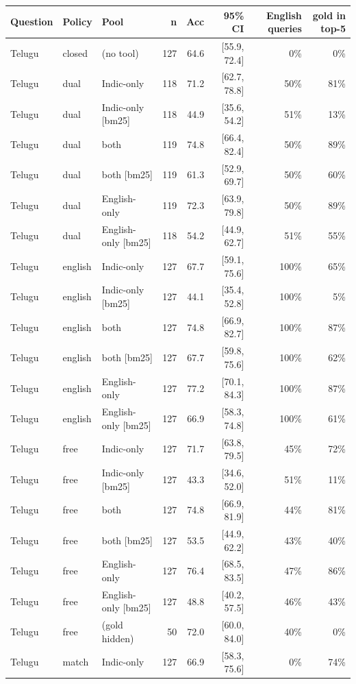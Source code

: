 \begin{table}[htbp]\centering\scriptsize
\begin{tabular}{lllrrrrr}
\toprule
Question & Policy & Pool & n & Acc & 95\% CI & English queries & gold in top-5 \\
\midrule
Telugu & closed & (no tool) & 127 & 64.6 & [55.9, 72.4] & 0\% & 0\% \\
Telugu & dual & Indic-only & 118 & 71.2 & [62.7, 78.8] & 50\% & 81\% \\
Telugu & dual & Indic-only [bm25] & 118 & 44.9 & [35.6, 54.2] & 51\% & 13\% \\
Telugu & dual & both & 119 & 74.8 & [66.4, 82.4] & 50\% & 89\% \\
Telugu & dual & both [bm25] & 119 & 61.3 & [52.9, 69.7] & 50\% & 60\% \\
Telugu & dual & English-only & 119 & 72.3 & [63.9, 79.8] & 50\% & 89\% \\
Telugu & dual & English-only [bm25] & 118 & 54.2 & [44.9, 62.7] & 51\% & 55\% \\
Telugu & english & Indic-only & 127 & 67.7 & [59.1, 75.6] & 100\% & 65\% \\
Telugu & english & Indic-only [bm25] & 127 & 44.1 & [35.4, 52.8] & 100\% & 5\% \\
Telugu & english & both & 127 & 74.8 & [66.9, 82.7] & 100\% & 87\% \\
Telugu & english & both [bm25] & 127 & 67.7 & [59.8, 75.6] & 100\% & 62\% \\
Telugu & english & English-only & 127 & 77.2 & [70.1, 84.3] & 100\% & 87\% \\
Telugu & english & English-only [bm25] & 127 & 66.9 & [58.3, 74.8] & 100\% & 61\% \\
Telugu & free & Indic-only & 127 & 71.7 & [63.8, 79.5] & 45\% & 72\% \\
Telugu & free & Indic-only [bm25] & 127 & 43.3 & [34.6, 52.0] & 51\% & 11\% \\
Telugu & free & both & 127 & 74.8 & [66.9, 81.9] & 44\% & 81\% \\
Telugu & free & both [bm25] & 127 & 53.5 & [44.9, 62.2] & 43\% & 40\% \\
Telugu & free & English-only & 127 & 76.4 & [68.5, 83.5] & 47\% & 86\% \\
Telugu & free & English-only [bm25] & 127 & 48.8 & [40.2, 57.5] & 46\% & 43\% \\
Telugu & free & (gold hidden) & 50 & 72.0 & [60.0, 84.0] & 40\% & 0\% \\
Telugu & match & Indic-only & 127 & 66.9 & [58.3, 75.6] & 0\% & 74\% \\

\end{tabular}
\end{table}
